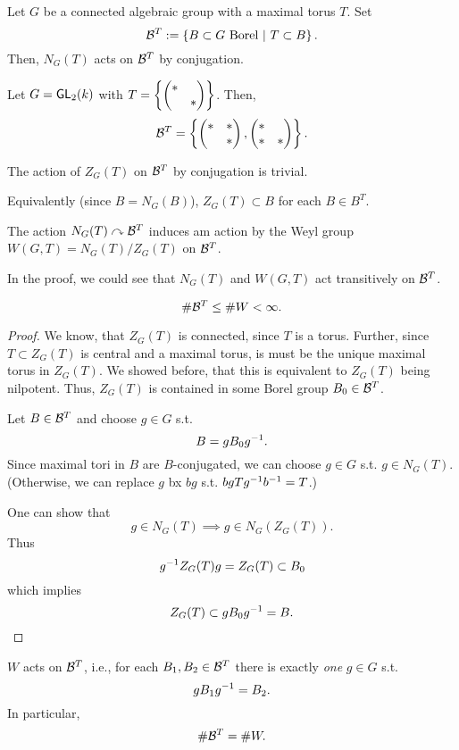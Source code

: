 Let $G$ be a connected algebraic group with a maximal torus $T$. Set
\[ \mathcal{B}^T := \left\lbrace B \subset G \text{ Borel} ~ | ~ T \subset B\right\rbrace. \]
Then, $N_G(T)$ acts on $\mathcal{B}^T$ by conjugation.
\begin{example}
Let $G = \textsf{GL}_2(k)$ with $T = \left\lbrace\left(\begin{matrix} * & \\ & * \end{matrix}\right)\right\rbrace$. Then,
\[ \mathcal{B}^T = \left\lbrace \left(\begin{matrix} * & *\\ & * \end{matrix}\right), \left(\begin{matrix} * & \\ * & * \end{matrix}\right) \right\rbrace. \]
\end{example}
\begin{lemma}
	The action of $Z_G(T)$ on $\mathcal{B}^T$ by conjugation is trivial.
	
	Equivalently (since $B = N_G(B)$), $Z_G(T) \subset B$ for each $B \in B^T$.
\end{lemma}
\begin{corollary}
	The action $N_G(T) \curvearrowright \mathcal{B}^T$ induces am action by the Weyl group $W(G,T) = N_G(T) / Z_G(T)$ on $\mathcal{B}^T$.
\end{corollary}
\begin{corollary}
	In the proof, we could see that $N_G(T)$ and $W(G,T)$ act transitively on $\mathcal{B}^T$.
\end{corollary}
\begin{corollary}
	\[ \# \mathcal{B}^T \leq \# W < \infty. \]
\end{corollary}
\newpage
\begin{proof}
	We know, that $Z_G(T)$ is connected, since $T$ is a torus. Further, since $T \subset Z_G(T)$ is central and a maximal torus, is must be the unique maximal torus in $Z_G(T)$.
	We showed before, that this is equivalent to $Z_G(T)$ being nilpotent. Thus, $Z_G(T)$ is contained in some Borel group $B_0 \in \mathcal{B}^T$.
	
	Let $B \in \mathcal{B}^T$ and choose $g \in G$ s.t.
	\[ B = gB_0g^{-1}. \]
	Since maximal tori in $B$ are $B$-conjugated, we can choose $g \in G$ s.t. $g \in N_G(T)$.
	(Otherwise, we can replace $g$ bx $bg$ s.t. $bgTg^{-1} b^{-1} = T$.)
	
	One can show that
	\[ g \in N_G(T) \implies g \in N_G(Z_G(T)). \]
	Thus
	\[g^{-1} Z_G(T) g = Z_G(T) \subset B_0 \]
	which implies
	\[ Z_G(T) \subset gB_0g^{-1} = B. \]
\end{proof}
\newpage

\begin{theorem}
	$W$ acts  on $\mathcal{B}^T$, i.e., for each $B_1, B_2 \in \mathcal{B}^T$ there is exactly \emph{one} $g \in G$ s.t.
	\[ gB_1g^{-1} = B_2. \]
	In particular,
	\[ \#\mathcal{B}^T = \# W. \]
\end{theorem}

